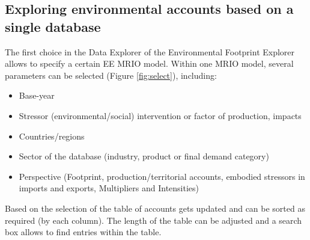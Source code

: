 \subsection{Exploring environmental accounts based on a single database}

The first choice in the Data Explorer of the Environmental Footprint Explorer allows to specify a certain EE MRIO model. 
Within one MRIO model, several parameters can be selected (Figure \ref{fig:select}), including:

\begin{itemize}
    \item Base-year
    \item Stressor (environmental/social) intervention or factor of production, impacts
    \item Countries/regions
    \item Sector of the database (industry, product or final demand category)
    \item Perspective (Footprint, production/territorial accounts, embodied
      stressors in imports and exports, Multipliers and Intensities)
\end{itemize}

Based on the selection of the table of accounts gets updated and can be sorted as required (by each column). The length of the table can be adjusted and a search box allows to find entries within the table. 

